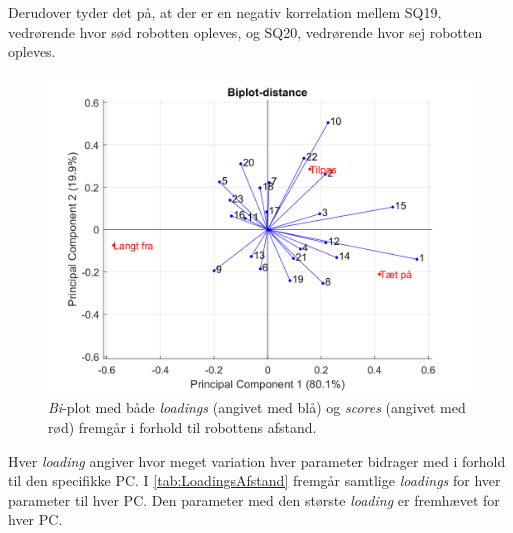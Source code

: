 Derudover tyder det på, at der er en negativ korrelation mellem SQ19, vedrørende hvor sød robotten opleves, og SQ20, vedrørende hvor sej robotten opleves.
%
\begin{figure}[H]
\centering
\includegraphics[width=\textwidth]{Figure/DatabehandlingSkalaer/PCAfigures/Distance-Biplot.png}
\caption{\textit{Bi}-plot med både \textit{loadings} (angivet med blå) og \textit{scores} (angivet med rød) fremgår i forhold til robottens afstand.}
\label{fig:Distance-Biplot}
\end{figure}
\noindent
%
Hver \textit{loading} angiver hvor meget variation hver parameter bidrager med i forhold til den specifikke PC. I \autoref{tab:LoadingsAfstand} fremgår samtlige \textit{loadings} for hver parameter til hver PC. Den parameter med den største \textit{loading} er fremhævet for hver PC. 
%
